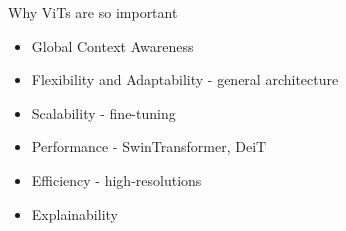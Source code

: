 \documentclass{beamer}
\begin{document}
\begin{frame}{Why ViTs are so important}
\begin{itemize}
\item Global Context Awareness
\item Flexibility and Adaptability - general architecture
\item Scalability - fine-tuning
\item Performance - SwinTransformer, DeiT
\item Efficiency - high-resolutions
\item Explainability
\end{itemize}





    
\end{frame}
\end{document}
